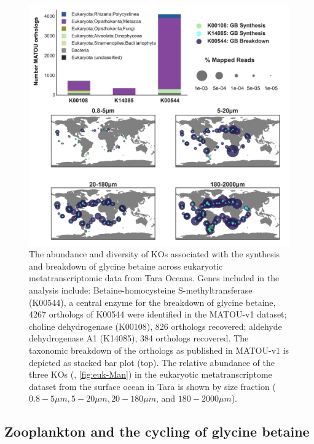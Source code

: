 \documentclass[utf8]{frontiersSCNS} %
\begin{document}
\begin{figure}[t!]
    \centering
    \includegraphics[width=0.85\columnwidth]{Figures/Euk_K00544_GBbreakdown-01.png}
    \caption{The abundance and diversity of KOs associated with the synthesis and breakdown of glycine betaine across eukaryotic metatranscriptomic data from Tara Oceans. Genes included in the analysis include: Betaine-homocysteine S-methyltransferase (K00544), a central enzyme for the breakdown of glycine betaine, 4267 orthologs of K00544 were identified in the MATOU-v1 dataset; choline dehydrogenase (K00108), 826 orthologs recovered; aldehyde dehydrogenase A1 (K14085), 384 orthologs recovered. The taxonomic breakdown of the orthologs as published in MATOU-v1 is depicted as stacked bar plot (top). The relative abundance of the three KOs (, \ref{fig:euk-Man}) in the eukaryotic metatranscriptome dataset from the surface ocean in Tara is shown by size fraction ($0.8-5 \mu m, 5-20 \mu m, 20-180 \mu m$, and $180-2000\mu m$).}
    \label{fig:tara-meta}
\end{figure}

\subsection{Zooplankton and the cycling of glycine betaine}
\end{document}
